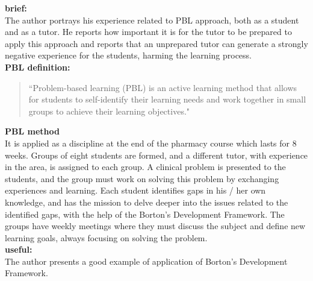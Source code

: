 \documentclass{article}
\begin{document}
\begin{adjustwidth}{-60pt}{-30pt}
\begin{singlespace}


\begin{minipage}{1.26\textwidth}

\begin{pabox}[label={myusecounter}]{\hfill  \cite{Fernandes2021}}

\textbf{brief:} \\

The author portrays his experience related to PBL approach, both as a student and as a tutor. He reports how important it is for the tutor to be prepared to apply this approach and reports that an unprepared tutor can generate a strongly negative experience for the students, harming the learning process.\\

\textbf{PBL definition:}
\begin{quote}
 ``Problem-based learning (PBL) is an active learning method that allows for students to self-identify their learning needs and work together in small groups to achieve their learning objectives."
\end{quote} 

\textbf{PBL method} \\

It is applied as a discipline at the end of the pharmacy course which lasts for 8 weeks. Groups of eight students are formed, and a different tutor, with experience in the area, is assigned to each group. A clinical problem is presented to the students, and the group must work on solving this problem by exchanging experiences and learning. Each student identifies gaps in his / her own knowledge, and has the mission to delve deeper into the issues related to the identified gaps, with the help of the Borton’s Development Framework. The groups have weekly meetings where they must discuss the subject and define new learning goals, always focusing on solving the problem. \\

\textbf{useful:} \\

The author presents a good example of application of Borton’s Development Framework.


\end{pabox}
\end{minipage}
\end{singlespace}
\end{adjustwidth}
\end{document}
